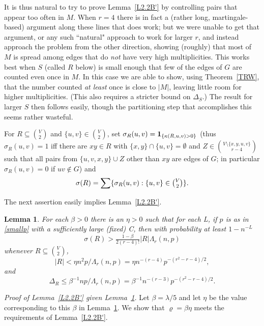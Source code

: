 \documentclass[letterpaper,11pt]{article}
\newtheorem{lemma}[thm]{Lemma}
\newcommand{\beq}[1]{\begin{equation}\label{#1}}
\newcommand{\enq}[0]{\end{equation}}
\newcommand{\mn}[0]{\medskip\noindent}
\newcommand{\sub}[0]{\subseteq}
\newcommand{\sm}[0]{\setminus}
\newcommand{\0}[0]{\emptyset}
\newcommand{\C}[2]{{{#1}\choose{{#2}}}}
\newcommand{\Cc}[0]{\tbinom}
\newcommand{\gb}[0]{\beta }
\newcommand{\gD}[0]{\Delta }
\newcommand{\gl}[0]{\lambda }
\newcommand{\gL}[0]{\Lambda}
\newcommand{\gs}[0]{\sigma}
\newcommand{\vr}[0]{\varrho}
\begin{document}
It is thus natural to try to prove Lemma~\ref{L2.2B'} by
controlling
pairs that appear
too often in $M$.
When $r=4 $
there is in fact a (rather long,
martingale-based) argument along these lines that does work;
but we were unable to get that argument, or
any such ``natural" approach to work
for larger $r$,
and instead approach the problem from the other direction,
showing (roughly) that most of $M$ is spread among edges that do
{\em not} have very high multiplicities.
%
This works best when $S$ (called $R$ below) is small enough that few
of the edges of $G$ are counted even once in $M$.
In this case we are able to show, using Theorem~\ref{TRW},
that the number counted {\em at least} once is close to $|M|$,
leaving little room for higher multiplicities.
(This also requires a stricter bound on $\gD_S$.)
The result for larger $S$ then follows easily, though the
partitioning step that accomplishes this seems rather wasteful.



\bigskip
For $R\sub \C{V}{2}$ and $\{u,v\}\in \C{V}{2}$,
set $\gs_R(u,v)= {\bf 1}_{\{\kappa(R,u,v)>0\}}$
(thus $\gs_R(u,v)=1$ iff there are
$xy\in R$ with $\{x,y\}\cap \{u,v\}=\0$ and
$Z\in \C{V\sm \{x,y,u,v\}}{r-4}$ such that all pairs
from $\{u,v,x,y\}\cup Z$ other than $xy$ are edges of $G$;
in particular $\gs_R(u,v)=0$ if $uv\not\in G$)
and
\[
\gs(R) =\sum\{\gs_R(u,v):\{u,v\}\in \Cc{V}{2}\}.
\]







\mn
The next assertion easily implies
Lemma~\ref{L2.2B'}.

\begin{lemma}\label{Rlemma}
For each $\gb> 0$ there is an $\eta>0$ such that
for each L, if $p$ is as in \eqref{smallp} with a
sufficiently large (fixed) C, then with probability at least
$1-n^{-L}$
\beq{Rreq}
\gs(R) > \tfrac{1- \gb}{2(r-4)!} |R|\gL_r(n,p)
\enq
whenever $R\sub \C{V}{2}$,
\beq{Rreq'}
|R|< \eta n^2p/\gL_r(n,p)=
\eta n^{-(r-4)}p^{-(r^2-r-4)/2},
\enq
and
\beq{gDR}
\gD_R \leq \gb^{-1}np/\gL_r(n,p)=
\gb^{-1} n^{-(r-3)}p^{-(r^2-r-4)/2}.
\enq
\end{lemma}








\mn
{\em Proof of Lemma~\ref{L2.2B'} given Lemma~\ref{Rlemma}.}
Let $\gb=\gl/5$ and
let $\eta$ be the value corresponding to this $\gb$
in Lemma~\ref{Rlemma}.
We show that
$\vr =\gb\eta$ meets the requirements of
Lemma~\ref{L2.2B'}.
\end{document}
